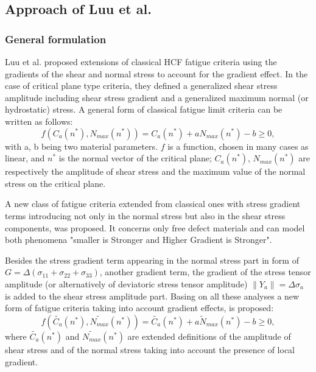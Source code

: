 \documentclass[3p,times,procedia,number]{elsarticle}
\begin{document}
\subsection{Approach of Luu et al.}
\subsubsection{General formulation}

Luu et al. \cite{luu2013formulation} proposed extensions of classical HCF fatigue criteria using the gradients of the shear and normal stress to account for the gradient effect. In the case of critical plane type criteria, they defined a generalized shear stress amplitude including shear stress gradient and a generalized maximum normal (or hydrostatic) stress.
A general form of classical fatigue limit criteria can be written as follows:
\begin{equation}
\label{eq:classical}
f(C_a(n^*),N_{max}(n^*))=C_a(n^*)+aN_{max}(n^*)-b\geqslant 0 ,
\end{equation}
with a, b being two material parameters. $f$ is a function, chosen in many cases as linear, and $n^*$ is the normal vector of the critical plane; $C_a(n^* )$, $N_{max} (n^* )$ are respectively the amplitude of shear stress and the maximum value of the normal stress on the critical plane.

A new class of fatigue criteria extended from classical ones with stress gradient terms introducing not only in the normal stress but also in the shear stress components, was proposed. It concerns only free defect materials and can model both phenomena "smaller is Stronger and Higher Gradient is Stronger". 

Besides the stress gradient term appearing in the normal stress part in form of $G=\Delta(\sigma_{11}+\sigma_{22}+\sigma_{33})$, another gradient term, the gradient of the stress tensor amplitude (or alternatively of deviatoric stress tensor amplitude) $\parallel{Y}_a\parallel={\Delta\sigma}_a$ is added to the shear stress amplitude part. Basing on all these analyses a new form of fatigue criteria taking into account gradient effects, is proposed:
\begin{equation}
f(\widetilde{C_a}(n^*),\widetilde{N_{max}}(n^*))=\widetilde{C_a}(n^*)+a\widetilde{N}_{max}(n^*)-b\geqslant 0 ,
\label{eq:gradient crossland}
\end{equation}
where $\widetilde{C_a}(n^*)$ and $\widetilde{N_{max}}(n^*)$ are extended definitions of the amplitude of shear stress and of the normal stress taking into account the presence of local gradient.
\end{document}
